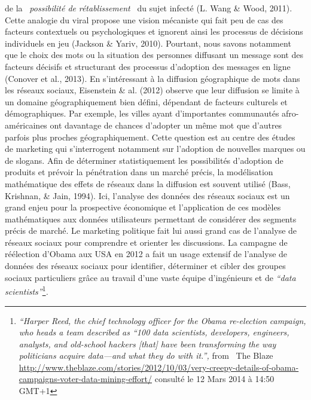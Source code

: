de la \textit{{\guillemotleft}~possibilit\'e de
}\textit{r\'etablissement~{\guillemotright} }du sujet infect\'e (L.
Wang \& Wood, 2011). Cette analogie du viral propose une vision
m\'ecaniste qui fait peu de cas des facteurs contextuels ou
psychologiques et ignorent ainsi les processus de d\'ecisions
individuels en jeu (Jackson \& Yariv, 2010). Pourtant, nous savons
notamment que le choix des mots ou la situation des personnes diffusant
un message sont des facteurs d\'ecisifs et structurant des processus
d{\textquoteright}adoption des messages en ligne (Conover et al.,
2013). En s{\textquoteright}int\'eressant \`a la diffusion
g\'eographique de mots dans les r\'eseaux sociaux, Eisenstein \& al.
(2012) observe que leur diffusion se limite \`a un domaine
g\'eographiquement bien d\'efini, d\'ependant de facteurs culturels et
d\'emographiques. Par exemple, les villes ayant
d{\textquoteright}importantes communaut\'es afro-am\'ericaines ont
davantage de chances d{\textquoteright}adopter un m\^eme mot que
d{\textquoteright}autres parfois plus proches g\'eographiquement. Cette
question est au centre des \'etudes de marketing qui
s{\textquoteright}interrogent notamment sur l{\textquoteright}adoption
de nouvelles marques ou de slogans. Afin de d\'eterminer
statistiquement les possibilit\'es d{\textquoteright}adoption de
produits et pr\'evoir la p\'en\'etration dans un march\'e pr\'ecis, la
mod\'elisation math\'ematique des effets de r\'eseaux dans la diffusion
est souvent utilis\'e (Bass, Krishnan, \& Jain, 1994). Ici,
l{\textquoteright}analyse des donn\'ees des r\'eseaux sociaux est un
grand enjeu pour la prospective \'economique et
l{\textquoteright}application de ces mod\`eles math\'ematiques aux
donn\'ees utilisateurs permettant de consid\'erer des segments pr\'ecis
de march\'e. Le marketing politique fait lui aussi grand cas de
l{\textquoteright}analyse de r\'eseaux sociaux pour comprendre et
orienter les discussions. La campagne de r\'e\'election
d{\textquoteright}Obama aux USA en 2012 a fait un usage extensif de
l{\textquoteright}analyse de donn\'ees des r\'eseaux sociaux pour
identifier, d\'eterminer et cibler des groupes sociaux particuliers
gr\^ace au travail d{\textquoteright}une vaste \'equipe
d{\textquoteright}ing\'enieurs et de \textit{{\textquotedblleft}data
scientists{\textquotedblright}}\footnote{
\textit{{\textquotedblleft}Harper Reed, the chief technology officer
for the Obama re-election campaign, who heads a team described as
{\textquotedblleft}100 data scientists, developers, engineers,
analysts, and old-school hackers [that] have been transforming the way
politicians acquire data---and what they do with
it.{\textquotedblright}, }from \ The Blaze
\url{http://www.theblaze.com/stories/2012/10/03/very-creepy-details-of-obama-campaigns-voter-data-mining-effort/}
consult\'e le 12 Mars 2014 \`a 14:50 GMT+1}\textit{. }

